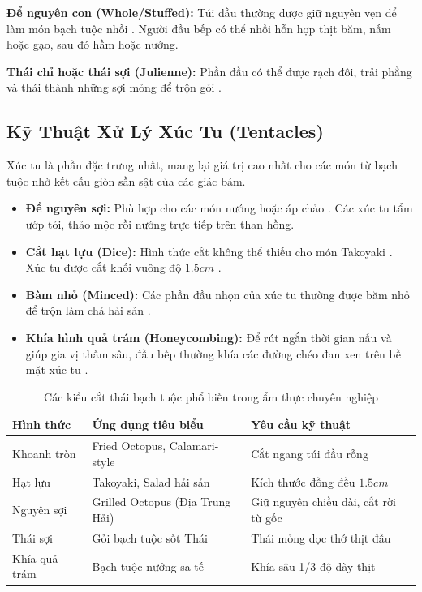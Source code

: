 \documentclass[12pt,a4paper]{report}
\begin{document}
\textbf{Để nguyên con (Whole/Stuffed):} Túi đầu thường được giữ nguyên vẹn để làm món bạch tuộc nhồi \cite{ref2}. Người đầu bếp có thể nhồi hỗn hợp thịt băm, nấm hoặc gạo, sau đó hầm hoặc nướng.

\textbf{Thái chỉ hoặc thái sợi (Julienne):} Phần đầu có thể được rạch đôi, trải phẳng và thái thành những sợi mỏng để trộn gỏi \cite{ref21}.

\subsection{Kỹ Thuật Xử Lý Xúc Tu (Tentacles)}

Xúc tu là phần đặc trưng nhất, mang lại giá trị cao nhất cho các món từ bạch tuộc nhờ kết cấu giòn sần sật của các giác bám.

\begin{itemize}
    \item \textbf{Để nguyên sợi:} Phù hợp cho các món nướng hoặc áp chảo \cite{ref25}. Các xúc tu tẩm ướp tỏi, thảo mộc rồi nướng trực tiếp trên than hồng.
    \item \textbf{Cắt hạt lựu (Dice):} Hình thức cắt không thể thiếu cho món Takoyaki \cite{ref36}. Xúc tu được cắt khối vuông độ $1.5cm$ \cite{ref36}.
    \item \textbf{Bàm nhỏ (Minced):} Các phần đầu nhọn của xúc tu thường được băm nhỏ để trộn làm chả hải sản \cite{ref21}.
    \item \textbf{Khía hình quả trám (Honeycombing):} Để rút ngắn thời gian nấu và giúp gia vị thấm sâu, đầu bếp thường khía các đường chéo đan xen trên bề mặt xúc tu \cite{ref17}.
\end{itemize}

\begin{table}[H]
\centering
\caption{Các kiểu cắt thái bạch tuộc phổ biến trong ẩm thực chuyên nghiệp}
\begin{tabular}{p{3.5cm} p{5.5cm} p{6cm}}
\toprule
\textbf{Hình thức} & \textbf{Ứng dụng tiêu biểu} & \textbf{Yêu cầu kỹ thuật} \\
\midrule
Khoanh tròn & Fried Octopus, Calamari-style & Cắt ngang túi đầu rỗng \cite{ref30} \\
Hạt lựu & Takoyaki, Salad hải sản & Kích thước đồng đều $1.5cm$ \cite{ref36} \\
Nguyên sợi & Grilled Octopus (Địa Trung Hải) & Giữ nguyên chiều dài, cắt rời từ gốc \cite{ref25} \\
Thái sợi & Gỏi bạch tuộc sốt Thái & Thái mỏng dọc thớ thịt đầu \cite{ref21} \\
Khía quả trám & Bạch tuộc nướng sa tế & Khía sâu 1/3 độ dày thịt \cite{ref17} \\
\bottomrule
\end{tabular}
\end{table}
\end{document}
